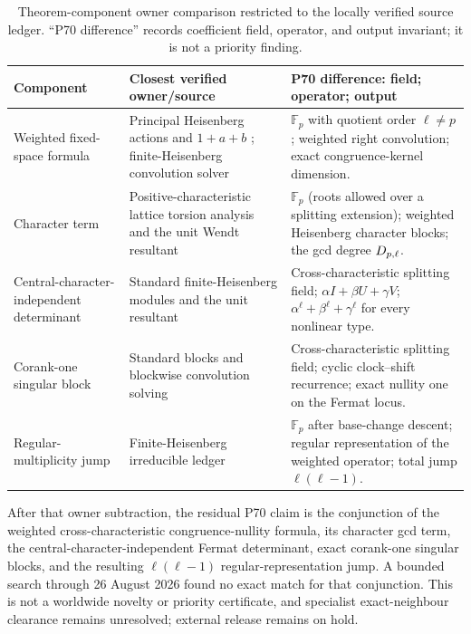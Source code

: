 \begin{table}[t]
\centering
\small
\caption{Theorem-component owner comparison restricted to the locally
verified source ledger.  ``P70 difference'' records coefficient field,
operator, and output invariant; it is not a priority finding.}
\label{tab:owner-comparison}
\begin{tabularx}{\textwidth}{@{}>{\raggedright\arraybackslash}p{}Y Y@{}}
\toprule
Component & Closest verified owner/source & P70 difference: field; operator; output \\
\midrule
Weighted fixed-space formula & Principal Heisenberg actions and $1+a+b$
\citep{GollSchmidtVerbitskiy2014,LindSchmidt2015}; finite-Heisenberg
convolution solver \citep{DeundyakLeonov2016}
& $\mathbb F_p$ with quotient order $\ell\ne p$; weighted right convolution;
exact congruence-kernel dimension. \\
Character term & Positive-characteristic lattice torsion analysis
\citep{Zaidenberg2008} and the unit Wendt resultant \citep{FordJha1993}
& $\mathbb F_p$ (roots allowed over a splitting extension); weighted
Heisenberg character blocks; the gcd degree $D_{p,\ell}$. \\
Central-character-independent determinant & Standard finite-Heisenberg
modules \citep{GurevichHadani2010,GrassbergerHormann2001} and the unit
resultant \citep{FordJha1993}
& Cross-characteristic splitting field; $\alpha I+\beta U+\gamma V$;
$\alpha^\ell+\beta^\ell+\gamma^\ell$ for every nonlinear type. \\
Corank-one singular block & Standard blocks and blockwise convolution solving
\citep{GurevichHadani2010,DeundyakLeonov2016}
& Cross-characteristic splitting field; cyclic clock--shift recurrence;
exact nullity one on the Fermat locus. \\
Regular-multiplicity jump & Finite-Heisenberg irreducible ledger
\citep{GrassbergerHormann2001,GurevichHadani2010}
& $\mathbb F_p$ after base-change descent; regular representation of the
weighted operator; total jump $\ell(\ell-1)$. \\
\bottomrule
\end{tabularx}
\end{table}

After that owner subtraction, the residual P70 claim is the conjunction of
the weighted cross-characteristic congruence-nullity formula, its character
gcd term, the central-character-independent Fermat determinant, exact
corank-one singular blocks, and the resulting $\ell(\ell-1)$
regular-representation jump.  A bounded search through 26 August 2026 found
no exact match for that conjunction.  This is not a worldwide novelty or
priority certificate, and specialist exact-neighbour clearance remains
unresolved; external release remains on hold.

